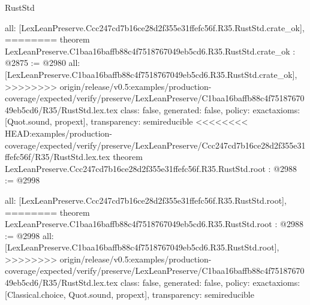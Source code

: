 \begin{lexlean}{RustStd}
\begin{coremodule}
{\begin{coremodule}
{{{{{{  all: [LexLeanPreserve.Ccc247cd7b16ce28d2f355e31ffefc56f.R35.RustStd.crate_ok],
========
theorem LexLeanPreserve.C1baa16baffb88c4f7518767049eb5cd6.R35.RustStd.crate_ok : @2875 := @2980 {
  all: [LexLeanPreserve.C1baa16baffb88c4f7518767049eb5cd6.R35.RustStd.crate_ok],
>>>>>>>> origin/release/v0.5:examples/production-coverage/expected/verify/preserve/LexLeanPreserve/C1baa16baffb88c4f7518767049eb5cd6/R35/RustStd.lex.tex
  class: false,
  generated: false,
  policy: exact{axioms: [Quot.sound, propext]},
  transparency: semireducible
}
<<<<<<<< HEAD:examples/production-coverage/expected/verify/preserve/LexLeanPreserve/Ccc247cd7b16ce28d2f355e31ffefc56f/R35/RustStd.lex.tex
theorem LexLeanPreserve.Ccc247cd7b16ce28d2f355e31ffefc56f.R35.RustStd.root : @2988 := @2998 {
  all: [LexLeanPreserve.Ccc247cd7b16ce28d2f355e31ffefc56f.R35.RustStd.root],
========
theorem LexLeanPreserve.C1baa16baffb88c4f7518767049eb5cd6.R35.RustStd.root : @2988 := @2998 {
  all: [LexLeanPreserve.C1baa16baffb88c4f7518767049eb5cd6.R35.RustStd.root],
>>>>>>>> origin/release/v0.5:examples/production-coverage/expected/verify/preserve/LexLeanPreserve/C1baa16baffb88c4f7518767049eb5cd6/R35/RustStd.lex.tex
  class: false,
  generated: false,
  policy: exact{axioms: [Classical.choice, Quot.sound, propext]},
  transparency: semireducible
}

}}}}}}}
\end{coremodule}}
\end{coremodule}
\end{lexlean}
